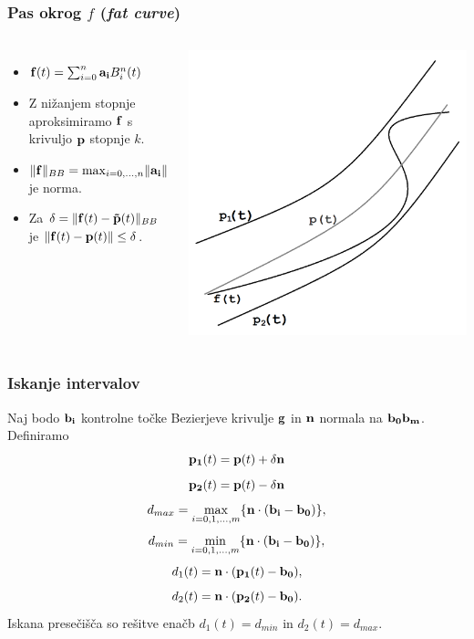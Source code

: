 \documentclass[unknownkeysallowed]{beamer}
\begin{document}
\begin{frame}
\frametitle{Pas okrog $f$ ({\em fat curve})}
\begin{columns}[c]
	\begin{itemize}
		\item ${\bf f}(t) = \sum _{i=0}^n{\bf a_i}B_i^n(t)$
		\medskip
		\item Z nižanjem stopnje aproksimiramo ${\bf f}$ s krivuljo ${\bf p}$ stopnje $k$.
		\medskip
		\item $\lVert {\bf f} \rVert _{BB} = \max _{i = 0,\ldots,n} \lVert {\bf a_i} \rVert $ je norma.
		\medskip
		\item Za $\delta = \lVert {\bf f}(t) - {\bf \tilde{p}}(t) \rVert _{BB}$ je $\lVert {\bf f}(t) - {\bf p}(t) \rVert \leq \delta$.
	\end{itemize}
	\includegraphics[width=0.9\linewidth,frame]{fat_curve}
\end{columns}
\end{frame}

\begin{frame}
\frametitle{Iskanje intervalov}
\begin{small}
Naj bodo ${\bf b_i}$ kontrolne točke Bezierjeve krivulje ${\bf g}$ in ${\bf n}$ normala na ${\bf b_0b_m}$. Definiramo
\medskip
$$
{\bf p_1}(t) = {\bf p}(t) + \delta {\bf n} 
$$
$$
{\bf p_2}(t) = {\bf p}(t) - \delta {\bf n}
$$
$$
d_{max} = \max _{i=0,1,\ldots,m}\{ {\bf n}\cdot({\bf b_i}-{\bf b_0})\},
$$
$$
d_{min} = \min _{i=0,1,\ldots,m} \{ {\bf n}\cdot({\bf b_i}-{\bf b_0})\} ,
$$
$$
d_1(t) = {\bf n}\cdot ({\bf p_1}(t) - {\bf b_0}),
$$
$$
d_2(t) = {\bf n}\cdot ({\bf p_2}(t) - {\bf b_0}).
$$
Iskana presečišča so rešitve enačb $d_1(t) = d_{min}$ in $d_2(t) = d_{max}$.
\end{small}
\end{frame}
\end{document}
